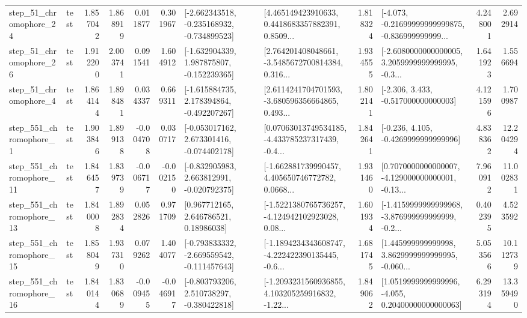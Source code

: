 \begin{tabular}{llrrrrllrlrr}
   step\_51\_chromophore\_24 &      test &      1.857042 &    1.868919 &      0.011877 &  0.301967 &  [-2.662343518, -0.235168932, -0.734899523] &  [4.465149423910633, 0.4418683357882391, 0.8509... &       1.818324 &  [-4.073, -0.21699999999999875, -0.836999999999... &            4.248001 &          2.692914 \\
   step\_51\_chromophore\_26 &      test &      1.912200 &    2.003741 &      0.091541 &  1.604912 &   [-1.632904339, 1.987875807, -0.152239365] &  [2.764201408048661, -3.5485672700814384, 0.316... &       1.934555 &  [-2.6080000000000005, 3.2059999999999995, -0.3... &            1.641923 &          1.556694 \\
    step\_51\_chromophore\_4 &      test &      1.864144 &    1.898481 &      0.034337 &  0.669311 &   [-1.615884735, 2.178394864, -0.492207267] &  [2.6114241704701593, -3.680596356664865, 0.493... &       1.802141 &                [-2.306, 3.433, -0.517000000000003] &            4.121596 &          1.700987 \\
   step\_551\_chromophore\_1 &      test &      1.903846 &    1.899138 &     -0.004708 &  0.030717 &   [-0.053017162, 2.673301416, -0.074402178] &  [0.07063013749534185, -4.433785237317439, -0.4... &       1.842641 &               [-0.236, 4.105, -0.4269999999999996] &            4.838362 &         12.204294 \\
  step\_551\_chromophore\_11 &      test &      1.846457 &    1.839739 &     -0.006717 & -0.002150 &   [-0.832905983, 2.663812991, -0.020792375] &  [-1.662881739990457, 4.405650746772782, 0.0668... &       1.931460 &  [0.7070000000000007, -4.129000000000001, -0.13... &            7.960912 &         11.002831 \\
  step\_551\_chromophore\_13 &      test &      1.840008 &    1.892834 &      0.052826 &  0.971709 &      [0.967712165, 2.646786521, 0.18986038] &  [-1.5221380765736257, -4.124942102923028, 0.08... &       1.601934 &  [-1.4159999999999968, -3.876999999999999, -0.2... &            0.402395 &          4.523592 \\
  step\_551\_chromophore\_15 &      test &      1.858049 &    1.937310 &      0.079262 &  1.404077 &  [-0.793833332, -2.669559542, -0.111457643] &  [-1.1894234343608747, -4.222422390135445, -0.6... &       1.681745 &  [1.445999999999998, 3.8629999999999995, -0.060... &            5.053566 &         10.112739 \\
  step\_551\_chromophore\_16 &      test &      1.840144 &    1.830689 &     -0.009455 & -0.046917 &   [-0.803793206, 2.510738297, -0.380422818] &  [-1.2093231560936855, 4.103205259916832, -1.22... &       1.849062 &  [1.0519999999999996, -4.055, 0.20400000000000063] &            6.293194 &         13.359490 \\

\end{tabular}
